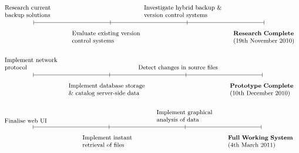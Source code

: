 \documentclass[a4paper]{article}
\begin{document}
\begin{flushright}
\[ 
\begin{tikzpicture}
    \tikzstyle{every node}=[font=\small]
    \draw (0,0) -- (12,0);

    \draw (0cm,3pt) -- (0cm,-3pt) node[text width=3cm,above=6pt] {Research
    current backup solutions};

    \draw (4cm,3pt) -- (4cm,-3pt) node[text width=4cm,below=6pt] {Evaluate
    existing version control systems};

    \draw (8cm,3pt) -- (8cm,-3pt) node[text width=4.5cm,above=6pt] {Investigate
    hybrid backup \& version control systems};

    \draw (12cm,3pt) -- (12cm,-3pt) node[text width=3.2cm,below=6pt]
    {\textbf{Research Complete} (19th November 2010)};

\end{tikzpicture}
\]

\[ 
\begin{tikzpicture}
    \tikzstyle{every node}=[font=\small]
    \draw (0,0) -- (12,0);

    \draw (0cm,3pt) -- (0cm,-3pt) node[text width=3cm,above=6pt] {Implement
    network protocol};

    \draw (4cm,3pt) -- (4cm,-3pt) node[text width=4.3cm,below=6pt] {Implement
    database storage \& catalog server-side data};

    \draw (8cm,3pt) -- (8cm,-3pt) node[text width=5cm,above=6pt] {Detect
    changes in source files};

    \draw (12cm,3pt) -- (12cm,-3pt) node[text width=3.4cm,below=6pt]
    {\textbf{Prototype Complete} (10th December 2010)};

\end{tikzpicture}
\]

\[ 
\begin{tikzpicture}
    \tikzstyle{every node}=[font=\small]
    \draw (0,0) -- (12,0);

    \draw (0cm,3pt) -- (0cm,-3pt) node[text width=3cm,above=6pt] {Finalise web
    UI};

    \draw (4cm,3pt) -- (4cm,-3pt) node[text width=2.8cm,below=6pt] {Implement
    instant retrieval of files};

    \draw (8cm,3pt) -- (8cm,-3pt) node[text width=3cm,above=6pt] {Implement
    graphical analysis of data};

    \draw (12cm,3pt) -- (12cm,-3pt) node[text width=3.5cm,below=6pt]
    {\textbf{Full Working System} (4th March 2011)};


\end{tikzpicture}\]
\end{flushright}
\end{document}
